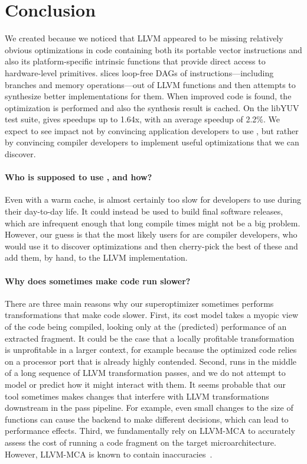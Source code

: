 \section{Conclusion}
\label{sec:conc}

We created \tool{} because we noticed that LLVM appeared to be missing
relatively obvious optimizations in code containing both its portable
vector instructions and also its platform-specific intrinsic
functions that provide direct access to hardware-level primitives.
%
\tool{} slices loop-free DAGs of instructions---including branches and
memory operations---out of LLVM functions and then attempts to
synthesize better implementations for them.
%
When improved code is found, the optimization is performed and also
the synthesis result is cached.
%
On the libYUV test suite, \tool{} gives speedups up to 1.64x,
with an average speedup of 2.2\%.
%
We expect to see impact not by convincing application developers to
use \tool, but rather by convincing compiler developers to implement
useful optimizations that we can discover.




\iffalse
\paragraph{Who is supposed to use \tool{}, and how?}
%
Even with a warm cache, \tool{} is almost certainly too slow for
developers to use during their day-to-day life.
%
It could instead be used to build final software releases, which are
infrequent enough that long compile times might not be a big problem.
%
However, our guess is that the most likely users for \tool{} are
compiler developers, who would use it to discover optimizations and
then cherry-pick the best of these and add them, by hand, to the LLVM
implementation.


\paragraph{Why does \tool{} sometimes make code run slower?}
%
There are three main reasons why our
superoptimizer sometimes performs transformations that make code
slower.
%
First, its cost model takes a myopic view of the code being compiled,
looking only at the (predicted) performance of an extracted fragment.
%
It could be the case that a locally profitable transformation is
unprofitable in a larger context, for example because the optimized
code relies on a processor port that is already highly contended.
%
Second, \tool{} runs in the middle of a long sequence of LLVM
transformation passes, and we do not attempt to model or predict how it
might interact with them.
%
It seems probable that our tool sometimes makes changes that interfere
with LLVM transformations downstream in the pass pipeline.
%
For example, even small changes to the size of functions can cause the
backend to make different decisions, which can lead to performance effects.
%
Third, we fundamentally rely on LLVM-MCA to accurately assess the cost
of running a code fragment on the target microarchitecture.
%
However, LLVM-MCA is known to contain inaccuracies~\cite{ithemal}.


